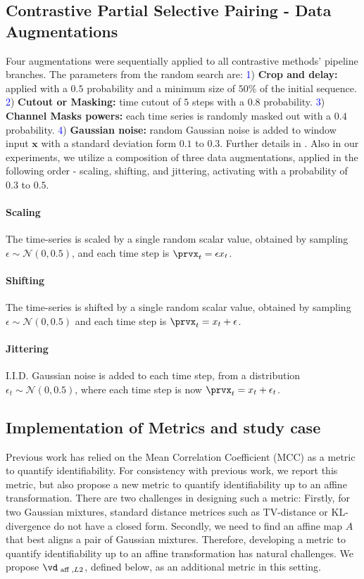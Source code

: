 \documentclass{article} %
\theoremstyle{plain}
\theoremstyle{definition}
\theoremstyle{remark}
\numberwithin{equation}{section}
\begin{document}
\subsection{Contrastive Partial Selective Pairing - Data Augmentations}\label{app:experiments}
\label{app:augmentations}
Four augmentations were sequentially applied to all contrastive methods' pipeline branches. The parameters from the random search are: \textcolor{blue}{1}) \textbf{Crop and delay:} applied with a $0.5$ probability and a minimum size of $50\%$ of the initial sequence. \textcolor{blue}{2}) \textbf{Cutout or Masking:} time cutout of $5$ steps with a $0.8$ probability. \textcolor{blue}{3}) \textbf{Channel Masks powers:} each time series is randomly masked out with a $0.4$ probability. \textcolor{blue}{4}) \textbf{Gaussian noise:} random Gaussian noise is added to window input $\mathbf{x}$ with a standard deviation form $0.1$ to $0.3$. Further details in . Also in our experiments, we utilize a composition of three data augmentations, applied in the following order - scaling, shifting, and jittering, activating with a probability of $0.3$ to $0.5$.
\paragraph{Scaling}
The time-series is scaled by a single random scalar value, obtained by sampling $\epsilon \sim \mathcal{N}(0, 0.5)$, and each time step is $\prvx_t = \epsilon x_t$.
\paragraph{Shifting}
The time-series is shifted by a single random scalar value, obtained by sampling $\epsilon \sim \mathcal{N}(0, 0.5)$ and each time step is $\prvx_t = x_t + \epsilon$.
\paragraph{Jittering}
I.I.D. Gaussian noise is added to each time step, from a distribution $\epsilon_t \sim \mathcal{N}(0, 0.5)$, where each time step is now $\prvx_t = x_t + \epsilon_t$.



\subsection{Implementation of Metrics and study case}\label{appendix:disnetangelement}\label{appendix:TDS_metric}
Previous work has relied on the Mean Correlation Coefficient (MCC) as a metric to quantify identifiability. For consistency with previous work, we report this metric, but also propose a new metric to quantify identifiability up to an affine transformation.
There are two challenges in designing such a metric:
Firstly, for two Gaussian mixtures, standard distance metrices such as TV-distance or KL-divergence do not have a closed form. Secondly, we need to find an affine map $A$ that best aligns a pair of Gaussian mixtures. 
Therefore, developing a metric to quantify identifiability up to an affine transformation has natural challenges. 
We propose $\vd_{\text{ aff }, L2}$, defined below, as an additional metric in this setting.
\end{document}
